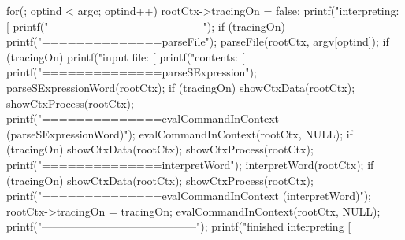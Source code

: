 {  for(; optind < argc; optind++) {
    rootCtx->tracingOn = false;
    printf("interpreting: [%
    printf("------------------------------------------\n");
    if (tracingOn) printf("==============\ncalling parseFile\n\n");
    parseFile(rootCtx, argv[optind]);
    if (tracingOn) {
      printf("input file: [%
      printf("contents:   [%
      printf("==============\ncalling parseSExpression\n\n");
    }
    parseSExpressionWord(rootCtx);
    if (tracingOn) {
      showCtxData(rootCtx);
      showCtxProcess(rootCtx);
      printf("==============\ncalling evalCommandInContext (parseSExpressionWord)\n\n");
    }
    evalCommandInContext(rootCtx, NULL);
    if (tracingOn) {
      showCtxData(rootCtx);
      showCtxProcess(rootCtx);
      printf("==============\ncalling interpretWord\n\n");
    }
    interpretWord(rootCtx);
    if (tracingOn) {
      showCtxData(rootCtx);
      showCtxProcess(rootCtx);
      printf("==============\ncalling evalCommandInContext (interpretWord)\n\n");
      rootCtx->tracingOn = tracingOn;
    }
    evalCommandInContext(rootCtx, NULL);
    printf("\n------------------------------------------\n");
    printf("finished interpreting [%
  }
}
\stopCCode
{}
